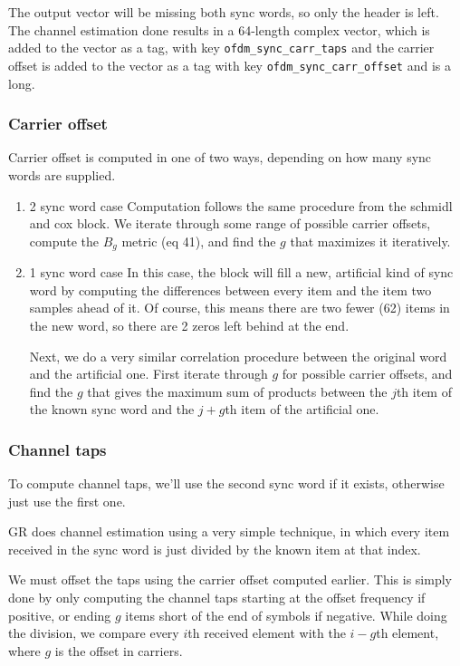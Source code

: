 \documentclass[11pt]{article}
\begin{document}
The output vector will be missing both sync words, so only the header
is left. The channel estimation done results in a 64-length complex
vector, which is added to the vector as a tag, with key
\texttt{ofdm\_sync\_carr\_taps} and the carrier offset is added to the vector as
a tag with key \texttt{ofdm\_sync\_carr\_offset} and is a long.

\subsubsection{Carrier offset}
\label{sec:orgdab2149}
Carrier offset is computed in one of two ways, depending on how many
sync words are supplied.
\begin{enumerate}
\item 2 sync word case
\label{sec:orgb595dc8}
Computation follows the same procedure from the schmidl and cox block.
We iterate through some range of possible carrier offsets, compute the
\(B_g\) metric (eq 41), and find the \(g\) that maximizes it iteratively.
\item 1 sync word case
\label{sec:orgdb7ae4e}
In this case, the block will fill a new, artificial kind of sync word
by computing the differences between every item and the item two
samples ahead of it. Of course, this means there are two fewer (62)
items in the new word, so there are 2 zeros left behind at the end.

Next, we do a very similar correlation procedure between the original
word and the artificial one. First iterate through \(g\) for possible
carrier offsets, and find the \(g\) that gives the maximum sum of products
between the \(j\)th item of the known sync word and the \(j + g\)th item
of the artificial one.
\end{enumerate}
\subsubsection{Channel taps}
\label{sec:org86bec03}
To compute channel taps, we'll use the second sync word if it exists,
otherwise just use the first one.

GR does channel estimation using a very simple technique, in which
every item received in the sync word is just divided by the known item
at that index.

We must offset the taps using the carrier offset computed
earlier. This is simply done by only computing the channel taps
starting at the offset frequency if positive, or ending \(g\) items
short of the end of symbols if negative. While doing the division, we
compare every \(i\)th received element with the \(i - g\)th element, where
\(g\) is the offset in carriers.
\end{document}
